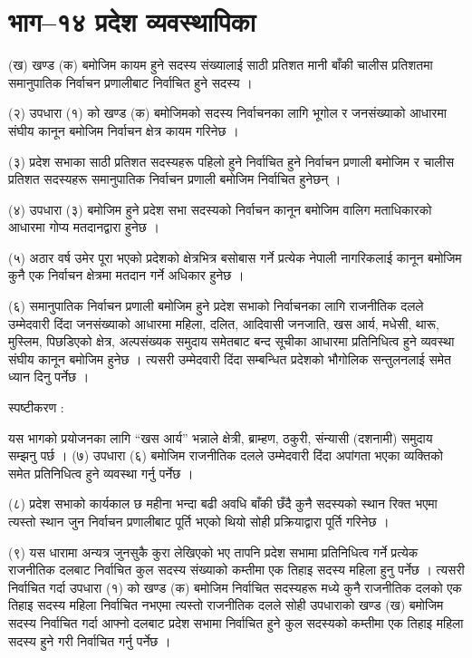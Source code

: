 \section{भाग–१४ प्रदेश व्यवस्थापिका}

(ख) खण्ड (क) बमोजिम कायम हुने सदस्य संख्यालाई साठी प्रतिशत मानी बाँकी चालीस प्रतिशतमा समानुपातिक निर्वाचन प्रणालीबाट निर्वाचित हुने सदस्य ।

(२) उपधारा (१) को खण्ड (क) बमोजिमको सदस्य निर्वाचनका लागि भूगोल र जनसंख्याको आधारमा संघीय कानून बमोजिम निर्वाचन क्षेत्र कायम गरिनेछ ।

(३) प्रदेश सभाका साठी प्रतिशत सदस्यहरू पहिलो हुने निर्वाचित हुने निर्वाचन प्रणाली बमोजिम र चालीस प्रतिशत सदस्यहरू समानुपातिक
निर्वाचन प्रणाली बमोजिम निर्वाचित हुनेछन् ।

(४) उपधारा (३) बमोजिम हुने प्रदेश सभा सदस्यको निर्वाचन कानून बमोजिम वालिग मताधिकारको आधारमा गोप्य मतदानद्वारा हुनेछ ।

(५) अठार वर्ष उमेर पूरा भएको प्रदेशको क्षेत्रभित्र बसोबास गर्ने प्रत्येक नेपाली नागरिकलाई कानून बमोजिम कुनै एक निर्वाचन क्षेत्रमा
मतदान गर्ने अधिकार हुनेछ ।

(६) समानुपातिक निर्वाचन प्रणाली बमोजिम हुने प्रदेश सभाको निर्वाचनका लागि राजनीतिक दलले उम्मेदवारी दिंदा जनसंख्याको आधारमा महिला, दलित, आदिवासी जनजाति, खस आर्य, मधेसी, थारू, मुस्लिम, पिछडिएको क्षेत्र, अल्पसंख्यक समुदाय समेतबाट बन्द सूचीका आधारमा प्रतिनिधित्व हुने व्यवस्था संघीय कानून बमोजिम हुनेछ । त्यसरी उम्मेदवारी दिंदा सम्बन्धित प्रदेशको भौगोलिक सन्तुलनलाई समेत ध्यान दिनु पर्नेछ ।

स्पष्टीकरण :

यस भागको प्रयोजनका लागि “खस आर्य” भन्नाले क्षेत्री, ब्राम्हण, ठकुरी, संन्यासी (दशनामी) समुदाय सम्झनु पर्छ । (७) उपधारा (६) बमोजिम राजनीतिक दलले उम्मेदवारी दिंदा अपांगता भएका व्यक्तिको समेत प्रतिनिधित्व हुने व्यवस्था गर्नु पर्नेछ ।

(८) प्रदेश सभाको कार्यकाल छ महीना भन्दा बढी अवधि बाँकी छँदै कुनै सदस्यको स्थान रिक्त भएमा त्यस्तो स्थान जुन निर्वाचन प्रणालीबाट पूर्ति भएको थियो सोही प्रक्रियाद्वारा पूर्ति गरिनेछ ।

(९) यस धारामा अन्यत्र जुनसुकै कुरा लेखिएको भए तापनि प्रदेश सभामा प्रतिनिधित्व गर्ने प्रत्येक राजनीतिक दलबाट निर्वाचित कुल सदस्य संख्याको कम्तीमा एक तिहाइ सदस्य महिला हुनु पर्नेछ । त्यसरी निर्वाचित गर्दा उपधारा (१) को खण्ड (क) बमोजिम निर्वाचित सदस्यहरू मध्ये कुनै राजनीतिक दलको एक तिहाइ सदस्य महिला निर्वाचित नभएमा त्यस्तो राजनीतिक दलले सोही उपधाराको खण्ड (ख) बमोजिम सदस्य निर्वाचित गर्दा आफ्नो दलबाट प्रदेश सभामा निर्वाचित हुने कुल सदस्यको कम्तीमा एक तिहाइ महिला सदस्य हुने गरी निर्वाचित गर्नु पर्नेछ ।

